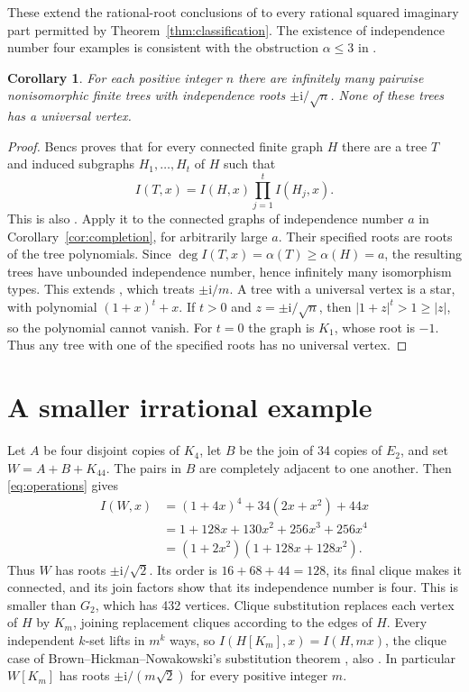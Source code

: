 \documentclass[11pt]{article}
\newtheorem{corollary}[theorem]{Corollary}
\newcommand{\ii}{\mathrm{i}}
\begin{document}
These extend the rational-root conclusions of
\cite[Theorems 2.8 and 2.12]{BC} to every rational squared imaginary part
permitted by Theorem~\ref{thm:classification}. The existence of independence
number four examples is consistent with the obstruction
$\alpha\leq3$ in \cite[Proposition 2.1]{BC}.

\begin{corollary}\label{cor:trees}
For each positive integer $n$ there are infinitely many pairwise
nonisomorphic finite trees with independence roots $\pm\ii/\sqrt n$.
None of these trees has a universal vertex.
\end{corollary}
\begin{proof}
Bencs \cite[Proposition 2.7(1)]{Bencs} proves that for every connected
finite graph $H$ there are a tree $T$ and induced subgraphs
$H_1,\ldots,H_t$ of $H$ such that
\[
 I(T,x)=I(H,x)\prod_{j=1}^t I(H_j,x).
\]
This is also \cite[Proposition 3.1]{BC}.
Apply it to the connected graphs of independence number $a$ in
Corollary~\ref{cor:completion}, for arbitrarily large $a$.
Their specified roots are roots of the tree polynomials. Since
$\deg I(T,x)=\alpha(T)\geq\alpha(H)=a$, the resulting trees have
unbounded independence number, hence infinitely many isomorphism types.
This extends \cite[Corollary 3.2]{BC}, which treats $\pm\ii/m$.
A tree with a universal vertex is a star, with polynomial $(1+x)^t+x$.
If $t>0$ and $z=\pm\ii/\sqrt n$, then $|1+z|^t>1\geq|z|$, so
the polynomial cannot vanish. For $t=0$ the graph is $K_1$, whose root
is $-1$. Thus any tree with one of the specified roots has no universal vertex.
\end{proof}

\section{A smaller irrational example}
Let $A$ be four disjoint copies of $K_4$, let $B$ be the join of
34 copies of $E_2$, and set $W=A+B+K_{44}$.
The pairs in $B$ are completely adjacent to one another.
Then \eqref{eq:operations} gives
\begin{align*}
 I(W,x)&=(1+4x)^4+34(2x+x^2)+44x\\
 &=1+128x+130x^2+256x^3+256x^4\\
 &=(1+2x^2)(1+128x+128x^2).
\end{align*}
Thus $W$ has roots $\pm\ii/\sqrt2$. Its order is $16+68+44=128$,
its final clique makes it connected, and its join factors show that its
independence number is four. This is smaller than $G_2$, which has 432
vertices. Clique substitution replaces each vertex of $H$ by $K_m$,
joining replacement cliques according to the edges of $H$. Every independent
$k$-set lifts in $m^k$ ways, so $I(H[K_m],x)=I(H,mx)$, the clique case of
Brown--Hickman--Nowakowski's substitution theorem \cite[Theorem 1]{BHN},
also \cite[Theorem 2.6]{BC}. In particular $W[K_m]$ has roots
$\pm\ii/(m\sqrt2)$ for every positive integer $m$.
\end{document}
